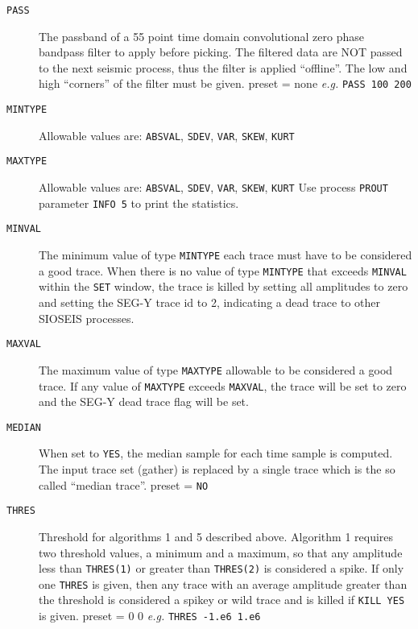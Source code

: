 \begin{description}
\item[\texttt{PASS}] The passband of a 55 point time domain convolutional zero phase bandpass filter to apply before picking.  The filtered data are NOT passed to the next seismic process, thus the filter is applied ``offline''.  The low and high ``corners'' of the filter must be given.  \Gls{preset} = none      \textit{e.g.}  \texttt{PASS 100 200}

\item[\texttt{MINTYPE}] Allowable values are: \texttt{ABSVAL}, \texttt{SDEV}, \texttt{VAR}, \texttt{SKEW}, \texttt{KURT}
\item[\texttt{MAXTYPE}] Allowable values are: \texttt{ABSVAL}, \texttt{SDEV}, \texttt{VAR}, \texttt{SKEW}, \texttt{KURT}
         Use process \texttt{PROUT} parameter \texttt{INFO 5} to print the statistics.
\item[\texttt{MINVAL}] The minimum value of type \texttt{MINTYPE} each trace must have to be
         considered a good trace.  When there is no value of type \texttt{MINTYPE}
         that exceeds \texttt{MINVAL} within the \texttt{SET} window, the trace is killed
         by setting all amplitudes to zero and setting the SEG-Y trace id
         to 2, indicating a dead trace to other SIOSEIS processes.
\item[\texttt{MAXVAL}] The maximum value of type \texttt{MAXTYPE} allowable to be considered
         a good trace.  If any value of \texttt{MAXTYPE} exceeds \texttt{MAXVAL}, the trace
         will be set to zero and the SEG-Y dead trace flag will be set.

\item[\texttt{MEDIAN}] When set to \texttt{YES}, the median sample for each time sample is
         computed.  The input trace set (\gls{gather}) is replaced by a
         single trace which is the so called ``median trace''.
         \Gls{preset} = \texttt{NO}

\item[\texttt{THRES}] Threshold for algorithms 1 and 5 described above.  Algorithm
         1 requires two threshold values, a minimum and a maximum,
         so that any amplitude less than \texttt{THRES(1)} or greater than
         \texttt{THRES(2)} is considered a spike.  If only one \texttt{THRES} is given,
         then any trace with an average amplitude greater than the
         threshold is considered a spikey or wild trace and is
         killed if \texttt{KILL YES} is given.
         \Gls{preset} = 0 0    \textit{e.g.}   \texttt{THRES -1.e6 1.e6}


\end{description}

